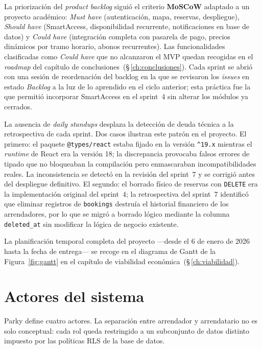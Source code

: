 La priorización del \textit{product backlog} siguió el criterio \textbf{MoSCoW} adaptado a un proyecto académico: \textit{Must have} (autenticación, mapa, reservas, despliegue), \textit{Should have} (SmartAccess, disponibilidad recurrente, notificaciones en base de datos) y \textit{Could have} (integración completa con pasarela de pago, precios dinámicos por tramo horario, abonos recurrentes). Las funcionalidades clasificadas como \textit{Could have} que no alcanzaron el MVP quedan recogidas en el \textit{roadmap} del capítulo de conclusiones~(§\,\ref{ch:conclusiones}). Cada sprint se abrió con una sesión de reordenación del backlog en la que se revisaron los \textit{issues} en estado \textit{Backlog} a la luz de lo aprendido en el ciclo anterior; esta práctica fue la que permitió incorporar SmartAccess en el sprint~4 sin alterar los módulos ya cerrados.

La ausencia de \textit{daily standups} desplaza la detección de deuda técnica a la retrospectiva de cada sprint. Dos casos ilustran este patrón en el proyecto. El primero: el paquete \texttt{@types/react} estaba fijado en la versión \texttt{\textasciicircum19.x} mientras el \textit{runtime} de React era la versión 18; la discrepancia provocaba falsos errores de tipado que no bloqueaban la compilación pero enmascaraban incompatibilidades reales. La inconsistencia se detectó en la revisión del sprint~7 y se corrigió antes del despliegue definitivo. El segundo: el borrado físico de reservas con \texttt{DELETE} era la implementación original del sprint~4; la retrospectiva del sprint~7 identificó que eliminar registros de \texttt{bookings} destruía el historial financiero de los arrendadores, por lo que se migró a borrado lógico mediante la columna \texttt{deleted\_at} sin modificar la lógica de negocio existente.

La planificación temporal completa del proyecto —desde el 6 de enero de 2026 hasta la fecha de entrega— se recoge en el diagrama de Gantt de la Figura~\ref{fig:gantt} en el capítulo de viabilidad económica~(§\,\ref{ch:viabilidad}).

\section{Actores del sistema}
\label{sec:actores}

Parky define cuatro actores. La separación entre arrendador y arrendatario no es solo conceptual: cada rol queda restringido a un subconjunto de datos distinto impuesto por las políticas RLS de la base de datos.

